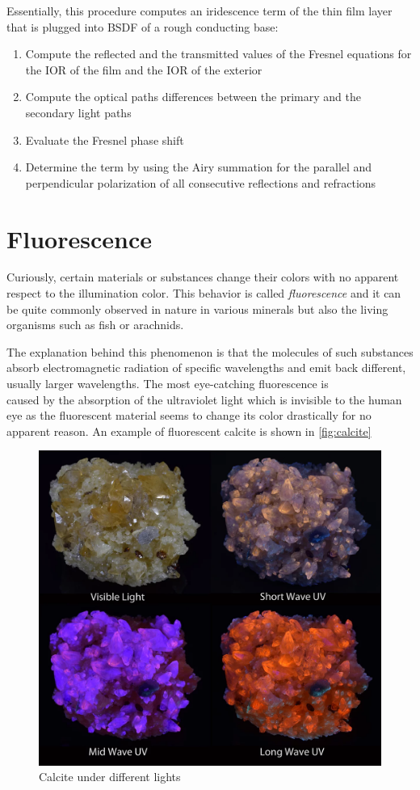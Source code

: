Essentially, this procedure computes an iridescence term of the thin film layer that is plugged into BSDF of a rough conducting base:

\begin{enumerate}
	\item Compute the reflected and the transmitted values of the Fresnel equations for the IOR of the film and the IOR of the exterior
	\item Compute the optical paths differences between the primary and the secondary light paths
	\item Evaluate the Fresnel phase shift
	\item Determine the term by using the Airy summation for the parallel and perpendicular polarization of all consecutive reflections and refractions
\end{enumerate}

\section{Fluorescence}

Curiously, certain materials or substances change their colors with no apparent respect to the illumination color. This behavior is called \emph{fluorescence} and it can be quite commonly observed in nature in various minerals but also the living organisms such as fish or arachnids.

The explanation behind this phenomenon is that the molecules of such substances absorb electromagnetic radiation of specific wavelengths and emit back different, usually larger wavelengths. The most eye-catching fluorescence is \\caused by the absorption of the ultraviolet light which is invisible to the human eye as the fluorescent material seems to change its color drastically for no apparent reason. An example of fluorescent calcite is shown in \autoref{fig:calcite}

\begin{figure}
	\centering
	\includegraphics[width=0.8\linewidth]{img/calcite.png}
	\caption[calcite]{Calcite under different lights\footnotemark}
	\label{fig:calcite}
\end{figure}

